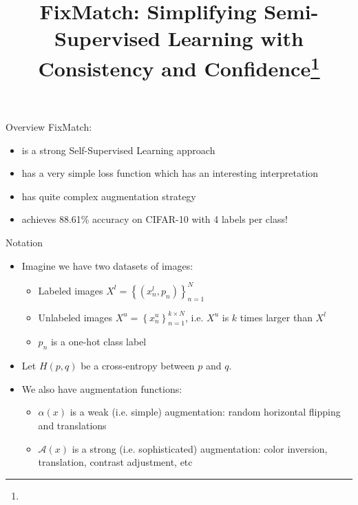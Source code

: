 \documentclass[10pt]{beamer}
\title{FixMatch: Simplifying Semi-Supervised Learning with
Consistency and Confidence\footnote{\citepaper{FixMatch}}}
\begin{document}
\begin{frame}
    \titlepage
\end{frame}

\begin{frame}{Overview}
    FixMatch:
    \begin{itemize}
        \item\pause is a strong Self-Supervised Learning approach
        \item\pause has a very simple loss function which has an interesting interpretation
        \item\pause has quite complex augmentation strategy
        \item\pause achieves 88.61\% accuracy on CIFAR-10 with 4 labels per class!
    \end{itemize}
\end{frame}

\begin{frame}{Notation}
    \begin{itemize}
        \item\pause Imagine we have two datasets of images:
            \begin{itemize}
                \item\pause Labeled images $X^l = \left\{\left(x_{n}^l, p_{n}\right)\right\}_{n=1}^N$
                \item\pause Unlabeled images $X^u = \left\{x_{n}^u \right\}_{n=1}^{k \times N}$, i.e. $X^u$ is $k$ times larger than $X^l$
                \item\pause $p_n$ is a one-hot class label
            \end{itemize}
        \item\pause Let $H(p, q)$ be a cross-entropy between $p$ and $q$.
        \item\pause We also have augmentation functions:
        \begin{itemize}
            \item\pause $\alpha(x)$ is a weak (i.e. simple) augmentation: random horizontal flipping and translations
            \item\pause $\mathcal{A}(x)$ is a strong (i.e. sophisticated) augmentation: color inversion, translation, contrast adjustment, etc
        \end{itemize}
    \end{itemize}
\end{frame}
\end{document}
